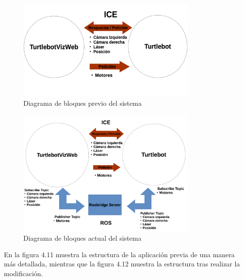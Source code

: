 \begin{figure}[H]
  \begin{center}
    \includegraphics[width=0.8\textwidth]{figures/Turtlebot1.png}
		\caption{Diagrama de bloques previo del sistema}
		\label{fig.esquematurtlebot1}
		\end{center}
\end{figure}

\begin{figure}[H]
  \begin{center}
    \includegraphics[width=0.8\textwidth]{figures/Turtlebot2.png}
		\caption{Diagrama de bloques actual del sistema}
		\label{fig.esquematurtlebot2}
		\end{center}
\end{figure}

En la figura 4.11 muestra la estructura de la aplicación previa de una manera más detallada, mientras que la figura 4.12 muestra la estructura tras realizar la modificación.


